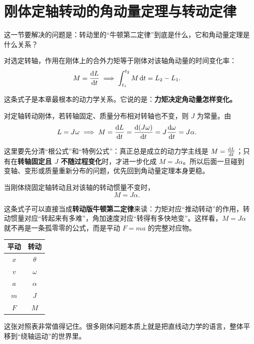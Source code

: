 \documentclass[lang=cn,11pt]{elegantbook}
\newcommand{\bridge}[1]{\begin{note}#1\end{note}}
\begin{document}
\section{刚体定轴转动的角动量定理与转动定律}

这一节要解决的问题是：转动里的“牛顿第二定律”到底是什么，它和角动量定理是什么关系？

\begin{theorem}[刚体定轴转动的角动量定理]\label{thm:rigid-body-angular-momentum-theorem}
对选定转轴，作用在刚体上的合外力矩等于刚体对该轴角动量的时间变化率：
\[
M=\dv{L}{t}
\implies
\int_{t_1}^{t_2} M\,\dd t=L_2-L_1.
\]
\end{theorem}

这条式子是本章最根本的动力学关系。它说的是：\textbf{力矩决定角动量怎样变化。}

对定轴转动刚体，若转轴固定、质量分布相对转轴也不变，则 \(J\) 为常量。由
\[
L=J\omega \implies M=\dv{L}{t}=\dv{(J\omega)}{t}=J\dv{\omega}{t}=J\alpha.
\]

\begin{note}
这里要先分清“根公式”和“特例公式”：真正总是成立的动力学主线是 \(M=\dv{L}{t}\)；只有在\textbf{转轴固定且 \(J\) 不随过程变化}时，才进一步化成 \(M=J\alpha\)。所以后面一旦碰到变轴、变形或质量重新分布的问题，优先回到角动量定理本身更稳。
\end{note}

\begin{theorem}[刚体定轴转动定律]\label{thm:rigid-body-rotation-law}
当刚体绕固定轴转动且对该轴的转动惯量不变时，
\[
M=J\alpha.
\]
\end{theorem}

这条式子可以直接当成\textbf{转动版牛顿第二定律}来读：力矩对应“推动转动”的作用，转动惯量对应“转起来有多难”，角加速度对应“转得有多快地变”。这样看，\(M=J\alpha\) 就不再是一条孤零零的公式，而是平动 \(F=ma\) 的完整对应物。

\begin{center}
\begin{tabular}{c|c}
平动 & 转动 \\
\hline
\(x\) & \(\theta\) \\
\(v\) & \(\omega\) \\
\(a\) & \(\alpha\) \\
\(m\) & \(J\) \\
\(F\) & \(M\)
\end{tabular}
\end{center}

\bridge{这张对照表非常值得记住。很多刚体问题本质上就是把直线动力学的语言，整体平移到“绕轴运动”的世界里。}
\end{document}
